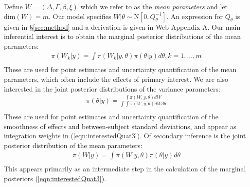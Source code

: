 \documentclass[]{article}
\begin{document}
Define $W = \left(\Delta, \Gamma,\beta, \xi \right)$ which we refer to as the \textit{mean parameters} and let $\text{dim}(W) = m$. Our model specifies $W|\theta\sim\text{N}\left[ 0,Q^{-1}_{\theta}\right]$. An expression for $Q_{\theta}$ is given in \S\ref{sec:method} and a derivation is given in Web Appendix A. Our main inferential interest is to obtain the marginal posterior distributions of the mean parameters:
\begin{equation}\begin{aligned}\label{eqn:interestedQuat3}
\pi(W_{k}|y) = \int \pi(W_{k}|y,\theta) \pi(\theta|y) d\theta, k = 1,\ldots,m  \\
\end{aligned}\end{equation}
These are used for point estimates and uncertainty quantification of the mean parameters, which often include the effects of primary interest. We are also interested in the joint posterior distributions of the variance parameters:
\begin{equation}\begin{aligned}\label{eqn:interestedQuat1}
\pi(\theta|y) = \frac{\int \pi(W,y,\theta) dW}{\int_{} \int_{} \pi(W,y,\theta) dW d\theta } \\
\end{aligned}\end{equation}
These are used for point estimates and uncertainty quantification of the smoothness of effects and between-subject standard deviations, and appear as integration weights in (\ref{eqn:interestedQuat3}). Of secondary inference is the joint posterior distribution of the mean parameters:
\begin{equation}\begin{aligned}\label{eqn:interestedQuat2}
\pi(W|y) = \int \pi(W|y,\theta) \pi(\theta|y) d\theta  \\
\end{aligned}\end{equation}
This appears primarily as an intermediate step in the calculation of the marginal posteriors (\ref{eqn:interestedQuat3}).
\end{document}
